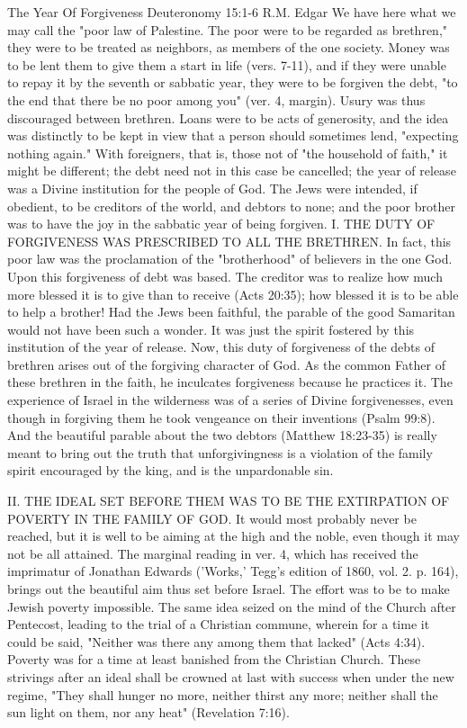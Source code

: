 \documentclass[11pt]{article}
\begin{document}
The Year Of Forgiveness
Deuteronomy 15:1-6
R.M. Edgar
We have here what we may call the "poor law of Palestine. The poor were to be regarded as brethren," they were to be treated as neighbors, as members of the one society. Money was to be lent them to give them a start in life (vers. 7-11), and if they were unable to repay it by the seventh or sabbatic year, they were to be forgiven the debt, "to the end that there be no poor among you" (ver. 4, margin). Usury was thus discouraged between brethren. Loans were to be acts of generosity, and the idea was distinctly to be kept in view that a person should sometimes lend, "expecting nothing again." With foreigners, that is, those not of "the household of faith," it might be different; the debt need not in this case be cancelled; the year of release was a Divine institution for the people of God. The Jews were intended, if obedient, to be creditors of the world, and debtors to none; and the poor brother was to have the joy in the sabbatic year of being forgiven.
I. THE DUTY OF FORGIVENESS WAS PRESCRIBED TO ALL THE BRETHREN. In fact, this poor law was the proclamation of the "brotherhood" of believers in the one God. Upon this forgiveness of debt was based. The creditor was to realize how much more blessed it is to give than to receive (Acts 20:35); how blessed it is to be able to help a brother! Had the Jews been faithful, the parable of the good Samaritan would not have been such a wonder. It was just the spirit fostered by this institution of the year of release. Now, this duty of forgiveness of the debts of brethren arises out of the forgiving character of God. As the common Father of these brethren in the faith, he inculcates forgiveness because he practices it. The experience of Israel in the wilderness was of a series of Divine forgivenesses, even though in forgiving them he took vengeance on their inventions (Psalm 99:8). And the beautiful parable about the two debtors (Matthew 18:23-35) is really meant to bring out the truth that unforgivingness is a violation of the family spirit encouraged by the king, and is the unpardonable sin.

II. THE IDEAL SET BEFORE THEM WAS TO BE THE EXTIRPATION OF POVERTY IN THE FAMILY OF GOD. It would most probably never be reached, but it is well to be aiming at the high and the noble, even though it may not be all attained. The marginal reading in ver. 4, which has received the imprimatur of Jonathan Edwards ('Works,' Tegg's edition of 1860, vol. 2. p. 164), brings out the beautiful aim thus set before Israel. The effort was to be to make Jewish poverty impossible. The same idea seized on the mind of the Church after Pentecost, leading to the trial of a Christian commune, wherein for a time it could be said, "Neither was there any among them that lacked" (Acts 4:34). Poverty was for a time at least banished from the Christian Church. These strivings after an ideal shall be crowned at last with success when under the new regime, "They shall hunger no more, neither thirst any more; neither shall the sun light on them, nor any heat" (Revelation 7:16).
\end{document}
